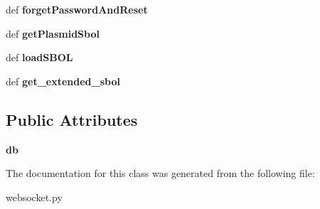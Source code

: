 \begin{DoxyCompactItemize}
\item 
\hypertarget{classweb_1_1websocket_1_1apis_a8d5d3e3fbbb95fcb1c2d0316ed861645}{def {\bfseries forget\-Password\-And\-Reset}}\label{classweb_1_1websocket_1_1apis_a8d5d3e3fbbb95fcb1c2d0316ed861645}

\item 
\hypertarget{classweb_1_1websocket_1_1apis_aff2c62acdee7baef7f071b4930718e3a}{def {\bfseries get\-Plasmid\-Sbol}}\label{classweb_1_1websocket_1_1apis_aff2c62acdee7baef7f071b4930718e3a}

\item 
\hypertarget{classweb_1_1websocket_1_1apis_ac595a074bc729b2bbcb8d5ad14cac637}{def {\bfseries load\-S\-B\-O\-L}}\label{classweb_1_1websocket_1_1apis_ac595a074bc729b2bbcb8d5ad14cac637}

\item 
\hypertarget{classweb_1_1websocket_1_1apis_a58588773b5a1229e88713bdba74b3056}{def {\bfseries get\-\_\-extended\-\_\-sbol}}\label{classweb_1_1websocket_1_1apis_a58588773b5a1229e88713bdba74b3056}

\end{DoxyCompactItemize}
\subsection*{Public Attributes}
\begin{DoxyCompactItemize}
\item 
\hypertarget{classweb_1_1websocket_1_1apis_ad550cb9e0f7743f19b2eae710004de53}{{\bfseries db}}\label{classweb_1_1websocket_1_1apis_ad550cb9e0f7743f19b2eae710004de53}

\end{DoxyCompactItemize}


The documentation for this class was generated from the following file\-:\begin{DoxyCompactItemize}
\item 
websocket.\-py\end{DoxyCompactItemize}
